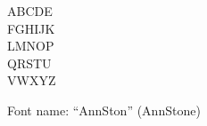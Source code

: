 \documentclass[a4paper]{article}
\begin{document}
\begin{center}
\fontsize{60pt}{72pt}
  ABCDE \\
  FGHIJK \\
  LMNOP \\
  QRSTU \\
  VWXYZ \\
\end{center}
\vfill
\begin{center}
Font name: ``AnnSton'' (AnnStone)
\end{center}
\end{document}
